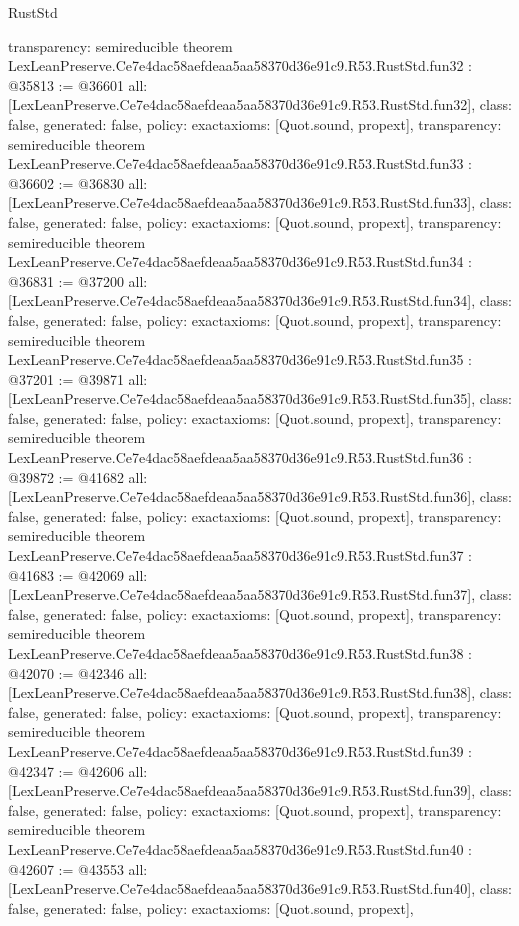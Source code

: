 \begin{lexlean}{RustStd}
\begin{coremodule}
{  transparency: semireducible
}
theorem LexLeanPreserve.Ce7e4dac58aefdeaa5aa58370d36e91c9.R53.RustStd.fun32 : @35813 := @36601 {
  all: [LexLeanPreserve.Ce7e4dac58aefdeaa5aa58370d36e91c9.R53.RustStd.fun32],
  class: false,
  generated: false,
  policy: exact{axioms: [Quot.sound, propext]},
  transparency: semireducible
}
theorem LexLeanPreserve.Ce7e4dac58aefdeaa5aa58370d36e91c9.R53.RustStd.fun33 : @36602 := @36830 {
  all: [LexLeanPreserve.Ce7e4dac58aefdeaa5aa58370d36e91c9.R53.RustStd.fun33],
  class: false,
  generated: false,
  policy: exact{axioms: [Quot.sound, propext]},
  transparency: semireducible
}
theorem LexLeanPreserve.Ce7e4dac58aefdeaa5aa58370d36e91c9.R53.RustStd.fun34 : @36831 := @37200 {
  all: [LexLeanPreserve.Ce7e4dac58aefdeaa5aa58370d36e91c9.R53.RustStd.fun34],
  class: false,
  generated: false,
  policy: exact{axioms: [Quot.sound, propext]},
  transparency: semireducible
}
theorem LexLeanPreserve.Ce7e4dac58aefdeaa5aa58370d36e91c9.R53.RustStd.fun35 : @37201 := @39871 {
  all: [LexLeanPreserve.Ce7e4dac58aefdeaa5aa58370d36e91c9.R53.RustStd.fun35],
  class: false,
  generated: false,
  policy: exact{axioms: [Quot.sound, propext]},
  transparency: semireducible
}
theorem LexLeanPreserve.Ce7e4dac58aefdeaa5aa58370d36e91c9.R53.RustStd.fun36 : @39872 := @41682 {
  all: [LexLeanPreserve.Ce7e4dac58aefdeaa5aa58370d36e91c9.R53.RustStd.fun36],
  class: false,
  generated: false,
  policy: exact{axioms: [Quot.sound, propext]},
  transparency: semireducible
}
theorem LexLeanPreserve.Ce7e4dac58aefdeaa5aa58370d36e91c9.R53.RustStd.fun37 : @41683 := @42069 {
  all: [LexLeanPreserve.Ce7e4dac58aefdeaa5aa58370d36e91c9.R53.RustStd.fun37],
  class: false,
  generated: false,
  policy: exact{axioms: [Quot.sound, propext]},
  transparency: semireducible
}
theorem LexLeanPreserve.Ce7e4dac58aefdeaa5aa58370d36e91c9.R53.RustStd.fun38 : @42070 := @42346 {
  all: [LexLeanPreserve.Ce7e4dac58aefdeaa5aa58370d36e91c9.R53.RustStd.fun38],
  class: false,
  generated: false,
  policy: exact{axioms: [Quot.sound, propext]},
  transparency: semireducible
}
theorem LexLeanPreserve.Ce7e4dac58aefdeaa5aa58370d36e91c9.R53.RustStd.fun39 : @42347 := @42606 {
  all: [LexLeanPreserve.Ce7e4dac58aefdeaa5aa58370d36e91c9.R53.RustStd.fun39],
  class: false,
  generated: false,
  policy: exact{axioms: [Quot.sound, propext]},
  transparency: semireducible
}
theorem LexLeanPreserve.Ce7e4dac58aefdeaa5aa58370d36e91c9.R53.RustStd.fun40 : @42607 := @43553 {
  all: [LexLeanPreserve.Ce7e4dac58aefdeaa5aa58370d36e91c9.R53.RustStd.fun40],
  class: false,
  generated: false,
  policy: exact{axioms: [Quot.sound, propext]},
}
\end{coremodule}
\end{lexlean}
